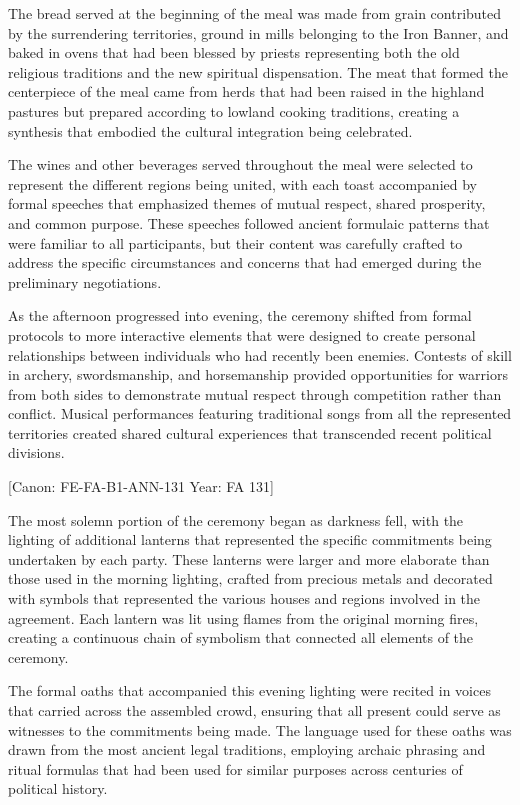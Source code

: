 The bread served at the beginning of the meal was made from grain
contributed by the surrendering territories, ground in mills belonging
to the Iron Banner, and baked in ovens that had been blessed by priests
representing both the old religious traditions and the new spiritual
dispensation. The meat that formed the centerpiece of the meal came from
herds that had been raised in the highland pastures but prepared
according to lowland cooking traditions, creating a synthesis that
embodied the cultural integration being celebrated.

The wines and other beverages served throughout the meal were selected
to represent the different regions being united, with each toast
accompanied by formal speeches that emphasized themes of mutual respect,
shared prosperity, and common purpose. These speeches followed ancient
formulaic patterns that were familiar to all participants, but their
content was carefully crafted to address the specific circumstances and
concerns that had emerged during the preliminary negotiations.

As the afternoon progressed into evening, the ceremony shifted from
formal protocols to more interactive elements that were designed to
create personal relationships between individuals who had recently been
enemies. Contests of skill in archery, swordsmanship, and horsemanship
provided opportunities for warriors from both sides to demonstrate
mutual respect through competition rather than conflict. Musical
performances featuring traditional songs from all the represented
territories created shared cultural experiences that transcended recent
political divisions.

{[}Canon: FE-FA-B1-ANN-131 \textbar{} Year: FA 131{]}

The most solemn portion of the ceremony began as darkness fell, with the
lighting of additional lanterns that represented the specific
commitments being undertaken by each party. These lanterns were larger
and more elaborate than those used in the morning lighting, crafted from
precious metals and decorated with symbols that represented the various
houses and regions involved in the agreement. Each lantern was lit using
flames from the original morning fires, creating a continuous chain of
symbolism that connected all elements of the ceremony.

The formal oaths that accompanied this evening lighting were recited in
voices that carried across the assembled crowd, ensuring that all
present could serve as witnesses to the commitments being made. The
language used for these oaths was drawn from the most ancient legal
traditions, employing archaic phrasing and ritual formulas that had been
used for similar purposes across centuries of political history.

